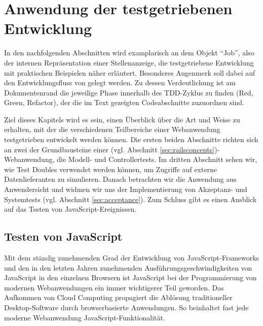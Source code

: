\chapter{Anwendung der testgetriebenen Entwicklung}
\label{sec:awtdd}

In den nachfolgenden Abschnitten wird examplarisch an dem Objekt "`Job"', also der internen Repräsentation einer Stellenanzeige, die testgetriebene Entwicklung mit praktischen Beispielen näher erläutert.
Besonderes Augenmerk soll dabei auf den Entwicklungsfluss von  gelegt werden. Zu dessen Verdeutlichung ist am Dokumentenrand die jeweilige Phase innerhalb des TDD-Zyklus zu finden (Red, Green, Refactor), der die im Text gezeigten Codeabschnitte zuzuordnen sind.

Ziel dieses Kapitels wird es sein, einen Überblick über die Art und Weise zu erhalten, mit der die verschiedenen Teilbereiche einer Webanwendung testgetrieben entwickelt werden können.
Die ersten beiden Abschnitte richten sich an zwei der Grundbausteine einer  (vgl. Abschnitt \ref{sec:railsconcepts})-Webanwendung, die Modell- und Controllertests. Im dritten Abschnitt sehen wir, wie Test Doubles verwendet werden können, um Zugriffe auf externe Datenlieferanten zu simulieren. Danach betrachten wir die Anwendung aus Anwendersicht und widmen wir uns der Implementierung von Akzeptanz- und Systemtests (vgl. Abschnitt \ref{sec:acceptance}).
Zum Schluss gibt es einen Ausblick auf das Testen von JavaScript-Ereignissen.






\section{Testen von JavaScript}

Mit dem ständig zunehmenden Grad der Entwicklung von JavaScript-Frameworks und den in den letzten Jahren zunehmenden Ausführungsgeschwindigkeiten von JavaScript in den einzelnen Browsern ist JavaScript bei der Programmierung von modernen Webanwendungen ein immer wichtigerer Teil geworden. Das Aufkommen von Cloud Computing propagiert die Ablösung traditioneller Desktop-Software durch browserbasierte Anwendungen. So beinhaltet fast jede moderne Webanwendung JavaScript-Funktionalität.

